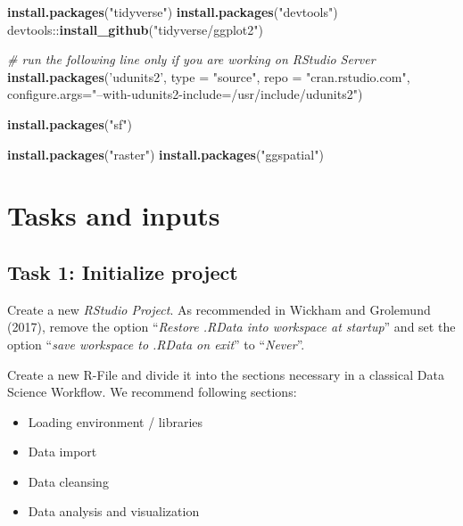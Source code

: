 \documentclass[]{book}
\newenvironment{Shaded}{\begin{snugshade}}{\end{snugshade}}
\newcommand{\KeywordTok}[1]{\textcolor[rgb]{0.13,0.29,0.53}{\textbf{{#1}}}}
\newcommand{\DataTypeTok}[1]{\textcolor[rgb]{0.13,0.29,0.53}{{#1}}}
\newcommand{\StringTok}[1]{\textcolor[rgb]{0.31,0.60,0.02}{{#1}}}
\newcommand{\CommentTok}[1]{\textcolor[rgb]{0.56,0.35,0.01}{\textit{{#1}}}}
\newcommand{\NormalTok}[1]{{#1}}
\providecommand{\tightlist}{%
  \setlength{\itemsep}{0pt}\setlength{\parskip}{0pt}}
\theoremstyle{definition}
\theoremstyle{definition}
\theoremstyle{definition}
\theoremstyle{remark}
\begin{document}
\begin{Shaded}
\begin{Highlighting}[]
\KeywordTok{install.packages}\NormalTok{(}\StringTok{"tidyverse"}\NormalTok{)}
\KeywordTok{install.packages}\NormalTok{(}\StringTok{"devtools"}\NormalTok{)}
\NormalTok{devtools::}\KeywordTok{install_github}\NormalTok{(}\StringTok{"tidyverse/ggplot2"}\NormalTok{)}

\CommentTok{# run the following line only if you are working on RStudio Server}
\KeywordTok{install.packages}\NormalTok{(}\StringTok{'udunits2'}\NormalTok{, }\DataTypeTok{type =} \StringTok{"source"}\NormalTok{, }\DataTypeTok{repo =} \StringTok{"cran.rstudio.com"}\NormalTok{, }\DataTypeTok{configure.args=}\StringTok{"--with-udunits2-include=/usr/include/udunits2"}\NormalTok{)}

\KeywordTok{install.packages}\NormalTok{(}\StringTok{"sf"}\NormalTok{)}



\KeywordTok{install.packages}\NormalTok{(}\StringTok{"raster"}\NormalTok{)}
\KeywordTok{install.packages}\NormalTok{(}\StringTok{"ggspatial"}\NormalTok{)}
\end{Highlighting}
\end{Shaded}

\section{Tasks and inputs}\label{tasks-and-inputs}

\subsection{Task 1: Initialize project}\label{task-1-initialize-project}

Create a new \emph{RStudio Project}. As recommended in Wickham and
Grolemund (2017), remove the option ``\emph{Restore .RData into
workspace at startup}'' and set the option ``\emph{save workspace to
.RData on exit}'' to ``\emph{Never}''.

Create a new R-File and divide it into the sections necessary in a
classical Data Science Workflow. We recommend following sections:

\begin{itemize}
\tightlist
\item
  Loading environment / libraries
\item
  Data import
\item
  Data cleansing
\item
  Data analysis and visualization
\end{itemize}
\end{document}
